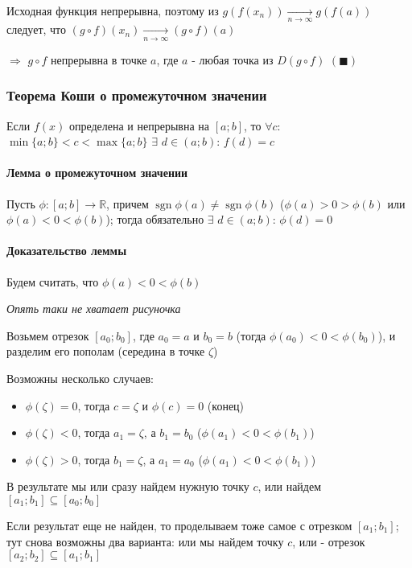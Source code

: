 \documentclass[class=article,a4paper,12pt,crop=false]{standalone}
\DeclareMathOperator{\sgn}{sgn}
\begin{document}
Исходная функция непрерывна, поэтому из $g(f(x_n)) \underset{n \rightarrow \infty}{\rightarrow} g(f(a))$
следует, что $(g\circ f)(x_n) \underset{n \rightarrow \infty}{\rightarrow} (g \circ f)(a)$

$\Rightarrow$ $g \circ f$ непрерывна в точке $a$, где $a$ - любая точка из $D(g \circ f)$ $(\blacksquare)$

\subsubsection{Теорема Коши о промежуточном значении}

Если $f(x)$ определена и непрерывна на $[a; b]$, то $\forall c$: $\min\{a; b\} < c < \max\{a; b\}$
$\exists$ $d \in (a; b)$: $f(d) = c$

\paragraph{Лемма о промежуточном значении} Пусть $\phi: [a; b] \longrightarrow \mathbb{R}$,
причем $\sgn{\phi(a)} \neq \sgn{\phi(b)}$ ($\phi(a) > 0 > \phi(b)$ или $\phi(a) < 0 < \phi(b)$);
тогда обязательно $\exists$ $d \in (a; b)$: $\phi(d) = 0$ 

\paragraph{Доказательство леммы} Будем считать, что $\phi(a) < 0 < \phi(b)$

\textit{Опять таки не хватает рисуночка}

Возьмем отрезок $[a_0; b_0]$, где $a_0 = a$ и $b_0 = b$ (тогда $\phi(a_0) < 0 < \phi(b_0)$),
и разделим его пополам (середина в точке $\zeta $)

Возможны несколько случаев:
\begin{itemize}
    \item {
        $\phi(\zeta) = 0$, тогда $c = \zeta$ и $\phi(c) = 0$ (конец)
    }
    \item {
        $\phi(\zeta) < 0$, тогда $a_1 = \zeta$, а $b_1 = b_0$ ($\phi(a_1) < 0 < \phi(b_1)$)
    }
    \item {
        $\phi(\zeta) > 0$, тогда $b_1 = \zeta$, а $a_1 = a_0$ ($\phi(a_1) < 0 < \phi(b_1)$)
    }
\end{itemize}

В результате мы или сразу найдем нужную точку $c$, или найдем $[a_1; b_1] \subseteq [a_0; b_0]$

Если результат еще не найден, то проделываем тоже самое с отрезком $[a_1; b_1]$; тут снова
возможны два варианта: или мы найдем точку $c$, или - отрезок $[a_2; b_2] \subseteq [a_1; b_1]$
\end{document}
